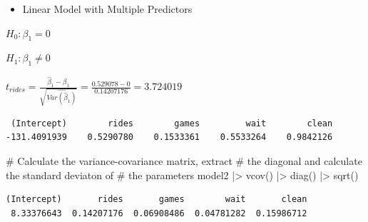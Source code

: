 \documentclass[
  ignorenonframetext,
]{beamer}
\newenvironment{Shaded}{\begin{snugshade}}{\end{snugshade}}
\newcommand{\CommentTok}[1]{\textcolor[rgb]{0.37,0.37,0.37}{#1}}
\newcommand{\FunctionTok}[1]{\textcolor[rgb]{0.28,0.35,0.67}{#1}}
\newcommand{\NormalTok}[1]{\textcolor[rgb]{0.00,0.23,0.31}{#1}}
\newcommand{\SpecialCharTok}[1]{\textcolor[rgb]{0.37,0.37,0.37}{#1}}
\providecommand{\tightlist}{%
  \setlength{\itemsep}{0pt}\setlength{\parskip}{0pt}}\usepackage{longtable,booktabs,array}
\begin{document}
\begin{frame}[fragile]{}
\label{section-21}
\begin{itemize}
\tightlist
\item
  Linear Model with Multiple Predictors
\end{itemize}

\(H_0: \beta_1 = 0\)

\(H_1: \beta_1 \neq 0\)

\(t_{rides} = \frac{\hat{\beta}_1 - \beta_1}{\sqrt{\widehat{Var(\hat{\beta}_1)}}} = \frac{0.529078 - 0}{0.14207176} = 3.724019\)

\tiny

\begin{Shaded}
\end{Shaded}

\begin{verbatim}
 (Intercept)        rides        games         wait        clean 
-131.4091939    0.5290780    0.1533361    0.5533264    0.9842126 
\end{verbatim}

\begin{Shaded}
\begin{Highlighting}[]
\CommentTok{\# Calculate the variance{-}covariance matrix, extract}
\CommentTok{\# the diagonal and calculate the standard deviaton of}
\CommentTok{\# the parameters}
\NormalTok{model2 }\SpecialCharTok{|\textgreater{}} \FunctionTok{vcov}\NormalTok{() }\SpecialCharTok{|\textgreater{}} \FunctionTok{diag}\NormalTok{() }\SpecialCharTok{|\textgreater{}} \FunctionTok{sqrt}\NormalTok{()}
\end{Highlighting}
\end{Shaded}

\begin{verbatim}
(Intercept)       rides       games        wait       clean 
 8.33376643  0.14207176  0.06908486  0.04781282  0.15986712 
\end{verbatim}
\end{frame}
\end{document}
